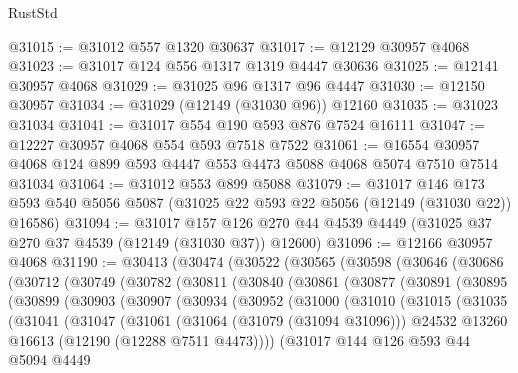 \begin{lexlean}{RustStd}
\begin{coremodule}
@31015 := @31012 @557 @1320 @30637
@31017 := @12129 @30957 @4068
@31023 := @31017 @124 @556 @1317 @1319 @4447 @30636
@31025 := @12141 @30957 @4068
@31029 := @31025 @96 @1317 @96 @4447
@31030 := @12150 @30957
@31034 := @31029 (@12149 (@31030 @96)) @12160
@31035 := @31023 @31034
@31041 := @31017 @554 @190 @593 @876 @7524 @16111
@31047 := @12227 @30957 @4068 @554 @593 @7518 @7522
@31061 := @16554 @30957 @4068 @124 @899 @593 @4447 @553 @4473 @5088 @4068 @5074 @7510 @7514 @31034
@31064 := @31012 @553 @899 @5088
@31079 := @31017
    @146
    @173
    @593
    @540
    @5056
    @5087
    (@31025 @22 @593 @22 @5056 (@12149 (@31030 @22)) @16586)
@31094 := @31017
    @157
    @126
    @270
    @44
    @4539
    @4449
    (@31025 @37 @270 @37 @4539 (@12149 (@31030 @37)) @12600)
@31096 := @12166 @30957 @4068
@31190 := @30413
    (@30474
      (@30522
        (@30565
          (@30598
            (@30646
              (@30686
                (@30712
                  (@30749
                    (@30782
                      (@30811
                        (@30840
                          (@30861
                            (@30877
                              (@30891
                                (@30895
                                  (@30899
                                    (@30903
                                      (@30907
                                        (@30934
                                          (@30952
                                            (@31000
                                              (@31010
                                                (@31015
                                                  (@31035
                                                    (@31041
                                                      (@31047
                                                        (@31061
                                                          (@31064 (@31079 (@31094 @31096)))
                                                          @24532
                                                          @13260
                                                          @16613
                                                          (@12190 (@12288 @7511 @4473))))
                                                      (@31017
                                                        @144
                                                        @126
                                                        @593
                                                        @44
                                                        @5094
                                                        @4449

\end{coremodule}
\end{lexlean}
